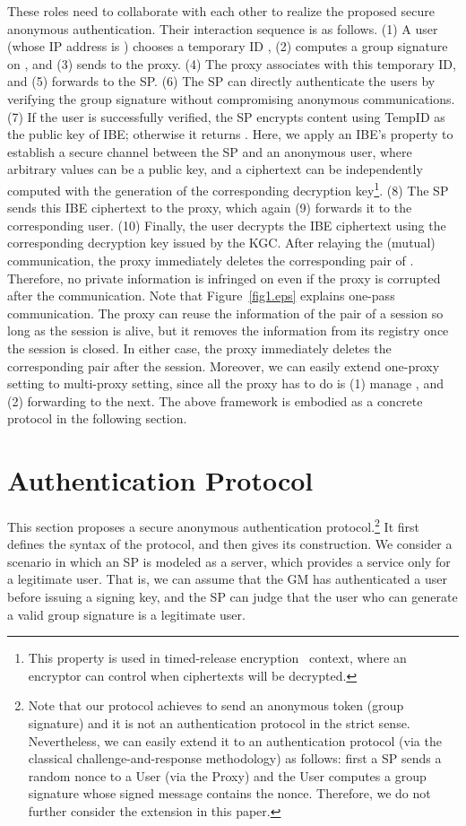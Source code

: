 \documentclass[preprint]{sig-alternate}
\begin{document}
These roles need to collaborate with each other to realize the proposed secure anonymous authentication.
Their interaction sequence is as follows.
(1) A user (whose IP address is ) chooses a temporary ID , (2) computes a group signature  on , and (3) sends  to the proxy.
(4) The proxy associates  with this temporary ID, and (5) forwards  to the SP.
(6) The SP can directly authenticate the users by verifying the group signature without compromising anonymous communications.
(7) If the user is successfully verified, the SP encrypts content using TempID as the public key of IBE; otherwise it returns .
Here, we apply an IBE's property to establish a secure channel between the SP and an anonymous user, where arbitrary values can be a public key, and a ciphertext can be independently computed with the generation of the corresponding decryption key\footnote{This property is used in timed-release encryption~\cite{[CheonHKO08]} context, where an encryptor can control when ciphertexts will be decrypted.}. 
(8) The SP sends this IBE ciphertext to the proxy, which again (9) forwards it to the corresponding user. (10) Finally, the user decrypts the IBE ciphertext using the corresponding decryption key issued by the KGC. 
After relaying the (mutual) communication, the proxy immediately deletes the corresponding pair of . 
Therefore, no private information is infringed on even if the proxy is corrupted after the communication. 
Note that Figure~\ref{fig1.eps} explains one-pass communication.
The proxy can reuse the information of the pair  of a session so long as the session is alive, but it removes the information from its registry once the session is closed. 
In either case, the proxy immediately deletes the corresponding pair  after the session.
Moreover, we can easily extend one-proxy setting to multi-proxy setting, since all the proxy has to do is (1) manage , and (2) forwarding  to the next. 
The above framework is embodied as a concrete protocol in the following section.




\section{Authentication Protocol}

This section proposes a secure anonymous authentication protocol.\footnote{Note that our protocol achieves to send an anonymous token (group signature) and it is not an authentication protocol in the strict sense. Nevertheless, we can easily extend it to an authentication protocol (via the classical challenge-and-response methodology) as follows: first a SP sends a random nonce to a User (via the Proxy) and the User computes a group signature whose signed message contains the nonce. Therefore, we do not further consider the extension in this paper.}
It first defines the syntax of the protocol, 
and then gives its construction. 
We consider a scenario in which an SP is modeled as a server, which provides a service only for a legitimate user. 
That is, we can assume that the GM has authenticated a user before issuing a signing key, and the SP can judge that the user who can generate a valid group signature is a legitimate user. 
\end{document}
